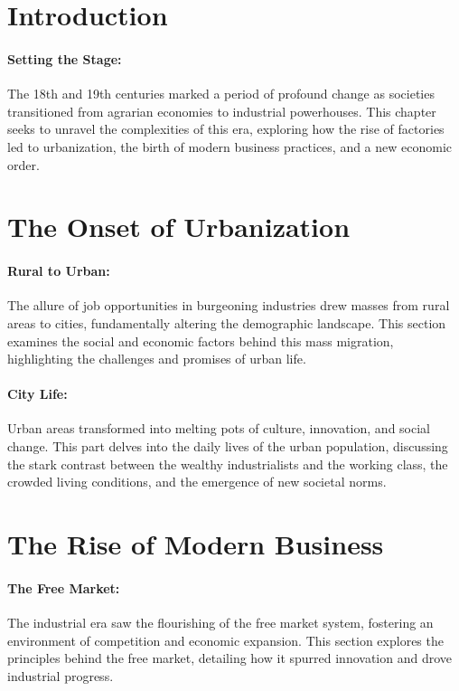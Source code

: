 \documentclass[a4paper,12pt]{book}
\begin{document}
\section*{Introduction}

\paragraph{Setting the Stage:}
The 18th and 19th centuries marked a period of profound change as societies transitioned from agrarian economies to industrial powerhouses. This chapter seeks to unravel the complexities of this era, exploring how the rise of factories led to urbanization, the birth of modern business practices, and a new economic order.

\section*{The Onset of Urbanization}

\paragraph{Rural to Urban:}
The allure of job opportunities in burgeoning industries drew masses from rural areas to cities, fundamentally altering the demographic landscape. This section examines the social and economic factors behind this mass migration, highlighting the challenges and promises of urban life.

\paragraph{City Life:}
Urban areas transformed into melting pots of culture, innovation, and social change. This part delves into the daily lives of the urban population, discussing the stark contrast between the wealthy industrialists and the working class, the crowded living conditions, and the emergence of new societal norms.

\section*{The Rise of Modern Business}

\paragraph{The Free Market:}
The industrial era saw the flourishing of the free market system, fostering an environment of competition and economic expansion. This section explores the principles behind the free market, detailing how it spurred innovation and drove industrial progress.
\end{document}
